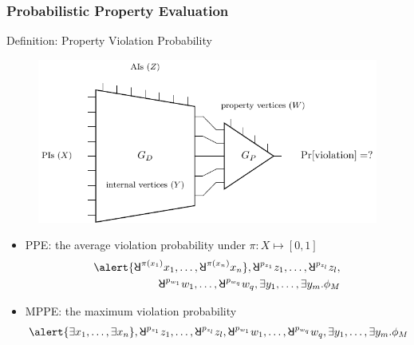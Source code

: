 \begin{frame}
    \frametitle{Probabilistic Property Evaluation}
    \begin{block}{Definition: Property Violation Probability}
        \begin{figure}
            \centering
            \includegraphics[scale=0.6]{fig/prob-design-eval/prob-spbn-miter.pdf}
        \end{figure}
        \begin{itemize}
            \item PPE: the average violation probability under $\pi:X\mapsto[0,1]$
                  \abovedisplayskip=0pt
                  \belowdisplayskip=0pt
                  \begin{align*}
                      \alert{\random{\pi(x_1)}x_1,\ldots,\random{\pi(x_n)}x_n},
                      \random{p_{z_1}}z_1,\ldots,\random{p_{z_l}}z_l, \\
                      \random{p_{w_1}}w_1,\ldots,\random{p_{w_q}}w_q,
                      \exists y_1,\ldots,\exists y_m.
                      \pf_M
                  \end{align*}
            \item MPPE: the maximum violation probability
                  \abovedisplayskip=0pt
                  \belowdisplayskip=0pt
                  \begin{align*}
                      \alert{\exists x_1,\ldots,\exists x_n},
                      \random{p_{z_1}}z_1,\ldots,\random{p_{z_l}}z_l,
                      \random{p_{w_1}}w_1,\ldots,\random{p_{w_q}}w_q,
                      \exists y_1,\ldots,\exists y_m.
                      \pf_M
                  \end{align*}
        \end{itemize}
    \end{block}
\end{frame}

